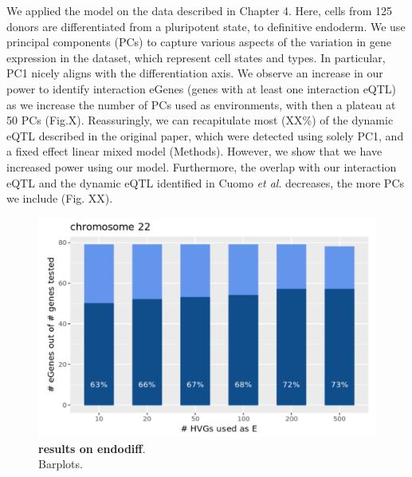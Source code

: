 We applied the model on the data described in Chapter 4.
Here, cells from 125 donors are differentiated from a pluripotent state, to definitive endoderm. 
We use 
principal components (PCs) 
to capture various aspects of the variation in gene expression in the dataset, which represent cell states and types. 
In particular, PC1 nicely aligns with the differentiation axis. 
We observe an increase in our power to identify interaction eGenes (genes with at least one interaction eQTL) as we increase the number of PCs used as environments, with then a plateau at 50 PCs (Fig.X).
Reassuringly, we can recapitulate most (XX\%) of the dynamic eQTL described in the original paper, which were detected using solely PC1, and a fixed effect linear mixed model (Methods). 
However, we show that we have increased power using our model. 
Furthermore, the overlap with our interaction eQTL and the dynamic eQTL identified in Cuomo \textit{et al}. decreases, the more PCs we include (Fig. XX).\\

\begin{figure}[htbp]
\centering
\includegraphics[width=15.5cm]{Chapter6/Fig/sc_structlmm_endodiff.png}
\caption[results on endodiff]{\textbf{results on endodiff}.\\
Barplots.}
\label{fig:sc_structlmm_endo_barplots}
\end{figure}







